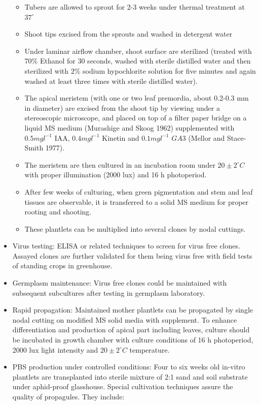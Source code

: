 \documentclass[
  openany]{book}
\providecommand{\tightlist}{%
  \setlength{\itemsep}{0pt}\setlength{\parskip}{0pt}}
\begin{document}
\begin{itemize}
  \begin{itemize}
  \tightlist
  \item
    Tubers are allowed to sprout for 2-3 weeks under thermal treatment at \(37^\circ\)
  \item
    Shoot tips excised from the sprouts and washed in detergent water
  \item
    Under laminar airflow chamber, shoot surface are sterilized (treated with 70\% Ethanol for 30 seconds, washed with sterile distilled water and then sterilized with 2\% sodium hypochlorite solution for five minutes and again washed at least three times with sterile distilled water).
  \item
    The apical meristem (with one or two leaf premordia, about 0.2-0.3 mm in diameter) are excised from the shoot tip by viewing under a stereoscopic microscope, and placed on top of a filter paper bridge on a liquid MS medium (Murashige and Skoog 1962) supplemented with \(0.5 mg l^{-1}\) IAA, \(0.4 mg l^{-1}\) Kinetin and \(0.1 mg l^{-1}\) \(GA 3\) (Mellor and Stace-Smith 1977).
  \item
    The meristem are then cultured in an incubation room under \(20\pm 2^\circ C\) with proper illumination (2000 lux) and 16 h photoperiod.
  \item
    After few weeks of culturing, when green pigmentation and stem and leaf tissues are observable, it is transferred to a solid MS medium for proper rooting and shooting.
  \item
    These plantlets can be multiplied into several clones by nodal cuttings.
  \end{itemize}
\item
  Virus testing: ELISA or related techniques to screen for virus free clones. Assayed clones are further validated for them being virus free with field tests of standing crops in greenhouse.
\item
  Germplasm maintenance: Virus free clones could be maintained with subsequent subcultures after testing in germplasm laboratory.
\item
  Rapid propagation: Maintained mother plantlets can be propagated by single nodal cutting on modified MS solid media with supplement. To enhance differentiation and production of apical part including leaves, culture should be incubated in growth chamber with culture conditions of 16 h photoperiod, 2000 lux light intensity and \(20 \pm 2^\circ C\) temperature.
\item
  PBS production under controlled conditions: Four to six weeks old in-vitro plantlets are transplanted into sterile mixture of 2:1 sand and soil substrate under aphid-proof glasshouse. Special cultivation techniques assure the quality of propagules. They include:


\end{itemize}
\end{document}
